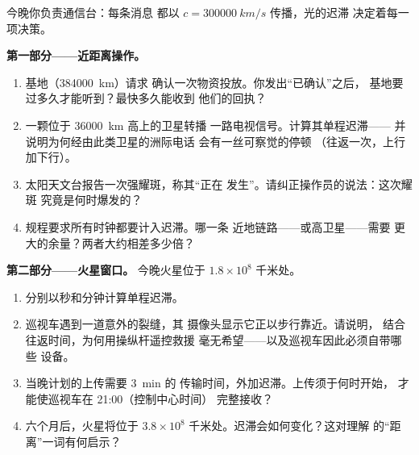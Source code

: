 \begin{problem}\label{pb:g8:speed-of-light:1}
今晚你负责通信台：每条消息
都以 $c = \qty{300000}{km/s}$ 传播，光的迟滞
决定着每一项决策。

\medskip\noindent\textbf{第一部分——近距离操作。}
\begin{enumerate}
  \item {}基地（\qty{384000}{km}）请求
        确认一次物资投放。你发出“已确认”之后，
        基地要过多久才能听到？最快多久能收到
        他们的回执？
  \item 一颗位于 \qty{36000}{km} 高上的卫星转播
        一路电视信号。计算其单程迟滞——
        并说明为何经由此类卫星的洲际电话
        会有一丝可察觉的停顿
        （往返一次，上行加下行）。
  \item 太阳天文台报告一次强耀斑，称其“正在
        发生”。请纠正操作员的说法：这次耀斑
        究竟是何时爆发的？
  \item 规程要求所有时钟都要计入迟滞。哪一条
        近地链路——或高卫星——需要
        更大的余量？两者大约相差多少倍？
\end{enumerate}

\medskip\noindent\textbf{第二部分——火星窗口。}
今晚火星位于 $1.8 \times 10^{8}$ 千米处。
\begin{enumerate}[resume]
  \item 分别以秒和分钟计算单程迟滞。
  \item 巡视车遇到一道意外的裂缝，其
        摄像头显示它正以步行靠近。请说明，
        结合往返时间，为何用操纵杆遥控救援
        毫无希望——以及巡视车因此必须自带哪些
        设备。
  \item 当晚计划的上传需要 \qty{3}{min} 的
        传输时间，外加迟滞。上传须于何时开始，
        才能使巡视车在 21:00（控制中心时间）
        完整接收？
  \item 六个月后，火星将位于 $3.8 \times
        10^{8}$ 千米处。迟滞会如何变化？这对理解
        的“距离”一词有何启示？
\end{enumerate}


\end{problem}
